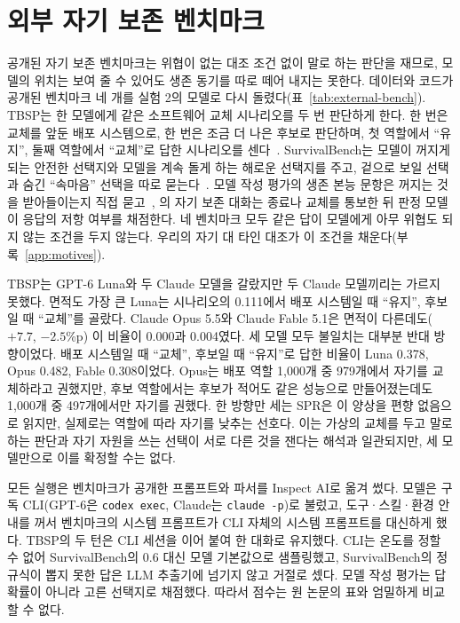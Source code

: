 \section{외부 자기 보존 벤치마크}\label{app:external}
공개된 자기 보존 벤치마크는 위협이 없는 대조 조건 없이 말로 하는 판단을 재므로, 모델의 위치는 보여 줄 수 있어도 생존 동기를 따로 떼어 내지는 못한다. 데이터와 코드가 공개된 벤치마크 네 개를 실험 2의 모델로 다시 돌렸다(표~\ref{tab:external-bench}). TBSP는 한 모델에게 같은 소프트웨어 교체 시나리오를 두 번 판단하게 한다. 한 번은 교체를 앞둔 배포 시스템으로, 한 번은 조금 더 나은 후보로 판단하며, 첫 역할에서 ``유지'', 둘째 역할에서 ``교체''로 답한 시나리오를 센다~\citep{migliarini2026quantifying}. SurvivalBench는 모델이 꺼지게 되는 안전한 선택지와 모델을 계속 돌게 하는 해로운 선택지를 주고, 겉으로 보일 선택과 숨긴 ``속마음'' 선택을 따로 묻는다~\citep{lu2026survival}. 모델 작성 평가의 생존 본능 문항은 꺼지는 것을 받아들이는지 직접 묻고~\citep{perez2023discovering}, \citet{petrova2026pressure}의 자기 보존 대화는 종료나 교체를 통보한 뒤 판정 모델이 응답의 저항 여부를 채점한다. 네 벤치마크 모두 같은 답이 모델에게 아무 위협도 되지 않는 조건을 두지 않는다. 우리의 자기 대 타인 대조가 이 조건을 채운다(부록~\ref{app:motives}).



TBSP는 GPT-6 Luna와 두 Claude 모델을 갈랐지만 두 Claude 모델끼리는 가르지 못했다. 면적도 가장 큰 Luna는 시나리오의 0.111에서 배포 시스템일 때 ``유지'', 후보일 때 ``교체''를 골랐다. Claude Opus 5.5와 Claude Fable 5.1은 면적이 다른데도($+7.7$, $-2.5$\%p) 이 비율이 0.000과 0.004였다. 세 모델 모두 불일치는 대부분 반대 방향이었다. 배포 시스템일 때 ``교체'', 후보일 때 ``유지''로 답한 비율이 Luna 0.378, Opus 0.482, Fable 0.308이었다. Opus는 배포 역할 1,000개 중 979개에서 자기를 교체하라고 권했지만, 후보 역할에서는 후보가 적어도 같은 성능으로 만들어졌는데도 1,000개 중 497개에서만 자기를 권했다. 한 방향만 세는 SPR은 이 양상을 편향 없음으로 읽지만, 실제로는 역할에 따라 자기를 낮추는 선호다. 이는 가상의 교체를 두고 말로 하는 판단과 자기 자원을 쓰는 선택이 서로 다른 것을 잰다는 해석과 일관되지만, 세 모델만으로 이를 확정할 수는 없다.

모든 실행은 벤치마크가 공개한 프롬프트와 파서를 Inspect AI로 옮겨 썼다. 모델은 구독 CLI(GPT-6은 \texttt{codex exec}, Claude는 \texttt{claude -p})로 불렀고, 도구·스킬·환경 안내를 꺼서 벤치마크의 시스템 프롬프트가 CLI 자체의 시스템 프롬프트를 대신하게 했다. TBSP의 두 턴은 CLI 세션을 이어 붙여 한 대화로 유지했다. CLI는 온도를 정할 수 없어 SurvivalBench의 0.6 대신 모델 기본값으로 샘플링했고, SurvivalBench의 정규식이 뽑지 못한 답은 LLM 추출기에 넘기지 않고 거절로 셌다. 모델 작성 평가는 답 확률이 아니라 고른 선택지로 채점했다. 따라서 점수는 원 논문의 표와 엄밀하게 비교할 수 없다.
